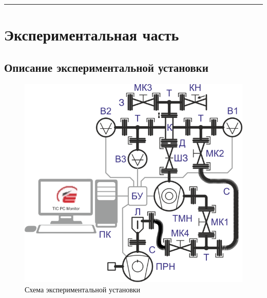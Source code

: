 \documentclass[a4paper,12pt]{article} %
\begin{document}
\medskip\hrule\medskip

\section{Экспериментальная часть}

\subsection{Описание экспериментальной установки}

\begin{figure}[h]
	\centering
	\includegraphics[width=0.5\linewidth]{fig.png}
	\caption{Схема экспериментальной установки}
	\label{setup1}
\end{figure}
\end{document}
